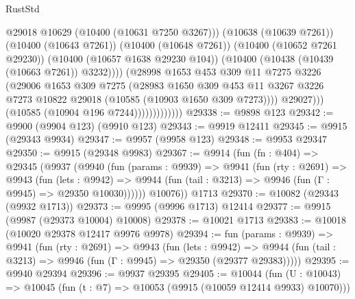 \begin{lexlean}{RustStd}
\begin{coremodule}
                                    @29018
                                    @10629
                                    (@10400 (@10631 @7250 @3267)))
                                  (@10638 (@10639 @7261))
                                  (@10400 (@10643 @7261))
                                  (@10400 (@10648 @7261))
                                  (@10400 (@10652 @7261 @29230))
                                  (@10400 (@10657 @1638 @29230 @104))
                                  (@10400 (@10438 (@10439 (@10663 @7261)) @3232))))
                              (@28998
                                @1653
                                @453
                                @309
                                @11
                                @7275
                                @3226
                                (@29006
                                  @1653
                                  @309
                                  @7275
                                  (@28983
                                    @1650
                                    @309
                                    @453
                                    @11
                                    @3267
                                    @3226
                                    @7273
                                    @10822
                                    @29018
                                    (@10585 (@10903 @1650 @309 @7273))))
                                @29027)))
                          (@10585 (@10904 @196 @7244)))))))))))))
@29338 := @9898 @123
@29342 := @9900 (@9904 @123) (@9910 @123)
@29343 := @9919 @12411
@29345 := @9915 (@29343 @9934)
@29347 := @9957 (@9958 @123)
@29348 := @9953 @29347
@29350 := @9915 (@29348 @9983)
@29367 := @9914
    (fun (fn : @404) =>
    @29345
      (@9937
        (@9940
          (fun (params : @9939) =>
          @9941
            (fun (rty : @2691) =>
            @9943
              (fun (lets : @9942) =>
              @9944 (fun (tail : @3213) => @9946 (fun (Γ : @9945) => @29350 @10030))))))
        @10076))
    @1713
@29370 := @10082 (@29343 (@9932 @1713))
@29373 := @9995 (@9996 @1713) @12414
@29377 := @9915 (@9987 (@29373 @10004) @10008)
@29378 := @10021 @1713
@29383 := @10018 (@10020 @29378 @12417 @9976 @9978)
@29394 := fun (params : @9939) =>
  @9941
    (fun (rty : @2691) =>
    @9943
      (fun (lets : @9942) =>
      @9944 (fun (tail : @3213) => @9946 (fun (Γ : @9945) => @29350 (@29377 @29383)))))
@29395 := @9940 @29394
@29396 := @9937 @29395
@29405 := @10044
    (fun (U : @10043) => @10045 (fun (t : @7) => @10053 (@9915 (@10059 @12414 @9933) @10070)))

\end{coremodule}
\end{lexlean}
